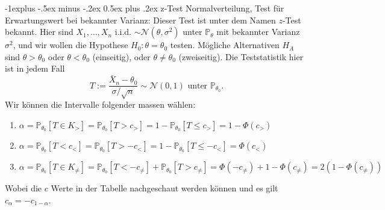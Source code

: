 \documentclass[10pt,landscape]{article}
\makeatletter
\renewcommand{\subsection}{\@startsection{subsection}{1}{0mm}%
                                {-1ex plus -.5ex minus -.2ex}%
                                {0.5ex plus .2ex}%
                                {\normalfont\large\bfseries}}
\renewcommand{\subsection}{\@startsection{subsection}{2}{0mm}%
                                {-1explus -.5ex minus -.2ex}%
                                {0.5ex plus .2ex}%
                                {\normalfont\normalsize\bfseries}}
\makeatother
\begin{document}
\begin{multicols}{3}
\subsection{z-Test}
Normalverteilung, Test für Erwartungswert bei bekannter Varianz: Dieser Test ist unter dem Namen $z$-Test bekannt. Hier sind $X_{1}, \ldots, X_{n}$ i.i.d. $\sim \mathcal{N}\left(\theta, \sigma^{2}\right)$ unter $\mathbb{P}_{\theta}$ mit bekannter Varianz $\sigma^{2}$, und wir wollen die Hypothese $H_{0}: \theta=\theta_{0}$ testen. 
Mögliche Alternativen $H_{A}$ sind $\theta>\theta_{0}$ oder $\theta<\theta_{0}$ (einseitig), oder $\theta \neq \theta_{0}$ (zweiseitig). 
Die Teststatistik hier ist in jedem Fall
$$
T:=\frac{\bar{X}_{n}-\theta_{0}}{\sigma / \sqrt{n}} \sim \mathcal{N}(0,1) \text { unter } \mathbb{P}_{\theta_{0}}.
$$
Wir können die Intervalle folgender massen wählen:
\begin{enumerate}
    \item $\alpha=\mathbb{P}_{\theta_{0}}\left[T \in K_{>}\right]=\mathbb{P}_{\theta_{0}}\left[T>c_{>}\right]=1-\mathbb{P}_{\theta_{0}}\left[T \leq c_{>}\right]=1-\Phi\left(c_{>}\right)$
    \item $\alpha=\mathbb{P}_{\theta_{0}}\left[T<c_{<}\right]=\mathbb{P}_{\theta_{0}}\left[T>-c_{<}\right] = 1 - \mathbb{P}_{\theta_{0}}\left[T \leq -c_{<}\right]=\Phi\left(c_{<}\right)$ 
    \item $\alpha=\mathbb{P}_{\theta_{0}}\left[T \in K_{\neq}\right]=\mathbb{P}_{\theta_{0}}\left[T<-c_{\neq}\right]+\mathbb{P}_{\theta_{0}}\left[T>c_{\neq}\right]=\Phi\left(-c_{\neq}\right)+1-\Phi\left(c_{\neq}\right)=2\left(1-\Phi\left(c_{\neq}\right)\right)$
\end{enumerate}
Wobei die $c$ Werte in der Tabelle nachgeschaut werden können und es gilt $c_{\alpha}=-c_{1-\alpha}$.

\end{multicols}
\end{document}
